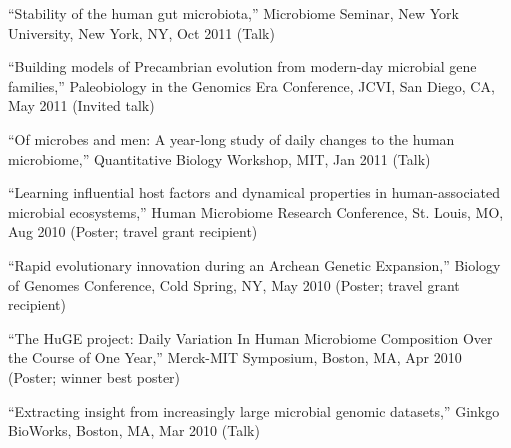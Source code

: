 \documentclass[overlapped,line,11pt]{res}
\newenvironment{list2}{
  \begin{list}{$\bullet$}{%
      \setlength{\itemsep}{0in}
      \setlength{\parsep}{0in} \setlength{\parskip}{0in}
      \setlength{\topsep}{0in} \setlength{\partopsep}{0in} 
      \setlength{\leftmargin}{0.2in}}}{\end{list}}
\begin{document}
\begin{resume}
\begin{revnumerate}[39]
\item {``Stability of the human gut microbiota,'' Microbiome Seminar,
  New York University, New York, NY, Oct 2011 (Talk)}
\vspace*{0mm}

\item {``Building models of Precambrian evolution from modern-day
  microbial gene families,'' Paleobiology in the Genomics Era
  Conference, JCVI, San Diego, CA, May 2011 (Invited talk)}
\vspace*{0mm}

\item {``Of microbes and men:
A year-long study of daily changes to the human microbiome,''
Quantitative Biology Workshop, MIT, Jan 2011 (Talk)}
\vspace*{0mm}

\item {``Learning influential host factors and dynamical properties in
human-associated microbial ecosystems,'' Human Microbiome Research
Conference, St. Louis, MO, Aug 2010 (Poster; travel grant recipient)}
\vspace*{0mm}

\item {``Rapid evolutionary innovation during an Archean Genetic
  Expansion,'' Biology of Genomes Conference, Cold Spring, NY,
  May 2010 (Poster; travel grant recipient)}
\vspace*{0mm}


\item {``The HuGE project: Daily Variation In Human Microbiome
Composition Over the Course of One Year,'' Merck-MIT Symposium,
Boston, MA, Apr 2010 (Poster; winner best poster)}
\vspace*{0mm}


\item {``Extracting insight from increasingly large microbial genomic
  datasets,'' Ginkgo BioWorks, Boston, MA, Mar 2010 (Talk)}
\vspace*{0mm}

\end{revnumerate}




\end{resume}
\end{document}
